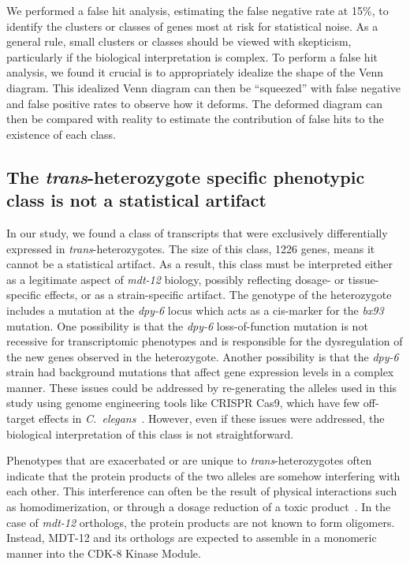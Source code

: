 \documentclass[10pt, twocolumn]{article}
\newcommand{\cel}{\emph{C.~elegans}}
\newcommand{\gene}[1]{\mbox{\emph{#1}}}
\newcommand{\protein}[1]{\mbox{\uppercase{#1}}}
\newcommand{\dpy}{\gene{mdt-12}}
\begin{document}
We performed a false hit analysis, estimating the false negative rate at 15\%,
to identify the clusters or classes of genes most at risk for statistical noise.
As a general rule, small clusters or classes should be viewed with skepticism,
particularly if the biological interpretation is complex. To perform a
false hit analysis, we found it crucial is to appropriately idealize the shape
of the Venn diagram. This idealized Venn diagram can then be ``squeezed'' with
false negative and false positive rates to observe how it deforms. The deformed
diagram can then be compared with reality to estimate the contribution of false
hits to the existence of each class.

\subsection*{The \emph{trans}-heterozygote specific phenotypic class is not a
             statistical artifact}
In our study, we found a class of transcripts that were exclusively
differentially expressed in \emph{trans}-heterozygotes. The size of this class,
1226 genes, means it cannot be a statistical artifact. As a result, this class
must be interpreted either as a legitimate aspect of \dpy{} biology, possibly
reflecting dosage- or tissue-specific effects, or as a strain-specific artifact.
The genotype of the heterozygote includes a mutation at the \gene{dpy-6} locus
which acts as a cis-marker for the \emph{bx93} mutation. One possibility is that
the \emph{dpy-6} loss-of-function mutation is not recessive for transcriptomic
phenotypes and is responsible for the dysregulation of the new genes observed in
the heterozygote. Another possibility is that the \emph{dpy-6} strain had
background mutations that affect gene expression levels in a complex manner.
These issues could be addressed by re-generating the alleles used in this study
using genome engineering tools like CRISPR Cas9, which have few off-target
effects in \cel{}~\cite{Chiu2013}. However, even if these issues were addressed,
the biological interpretation of this class is not straightforward.

Phenotypes that are exacerbated or are unique to \emph{trans}-heterozygotes
often indicate that the protein products of the two alleles are somehow
interfering with each other. This interference can often be the result of
physical interactions such as homodimerization, or through a dosage reduction of
a toxic product~\cite{Yook2005}. In the case of \dpy{} orthologs, the protein
products are not known to form oligomers. Instead, \protein{mdt-12} and its
orthologs are expected to assemble in a monomeric manner into the
\protein{cdk-8} Kinase Module.
\end{document}
